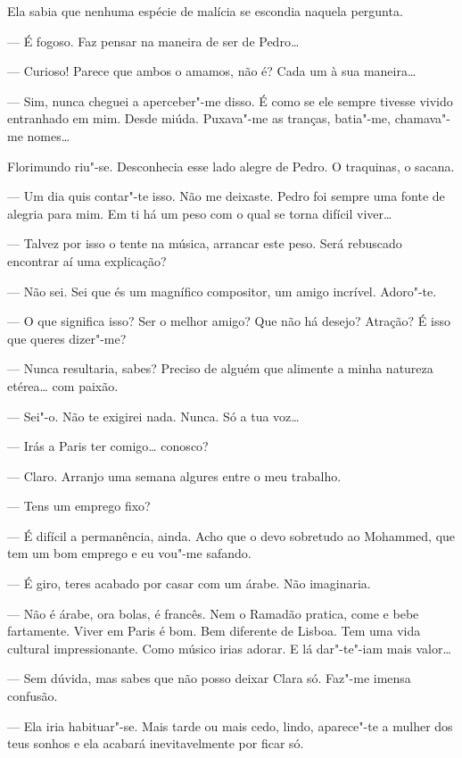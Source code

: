 Ela sabia que nenhuma espécie de malícia se escondia naquela pergunta.

--- É fogoso. Faz pensar na maneira de ser de Pedro\ldots{}

--- Curioso! Parece que ambos o amamos, não é? Cada um à sua maneira\ldots{}

--- Sim, nunca cheguei a aperceber"-me disso. É como se ele sempre tivesse
vivido entranhado em mim. Desde miúda. Puxava"-me as tranças, batia"-me,
chamava"-me nomes\ldots{}

Florimundo riu"-se. Desconhecia esse lado alegre de Pedro. O traquinas, o
sacana.

--- Um dia quis contar"-te isso. Não me deixaste. Pedro foi sempre uma
fonte de alegria para mim. Em ti há um peso com o qual se torna difícil
viver\ldots{}

--- Talvez por isso o tente na música, arrancar este peso. Será rebuscado
encontrar aí uma explicação?

--- Não sei. Sei que és um magnífico compositor, um amigo incrível.
Adoro"-te.

--- O que significa isso? Ser o melhor amigo? Que não há desejo? Atração?
É isso que queres dizer"-me?

--- Nunca resultaria, sabes? Preciso de alguém que alimente a minha
natureza etérea\ldots{} com paixão.

--- Sei"-o. Não te exigirei nada. Nunca. Só a tua voz\ldots{}

--- Irás a Paris ter comigo\ldots{} conosco?

--- Claro. Arranjo uma semana algures entre o meu trabalho.

--- Tens um emprego fixo?

--- É difícil a permanência, ainda. Acho que o devo sobretudo ao Mohammed,
que tem um bom emprego e eu vou"-me safando.

--- É giro, teres acabado por casar com um árabe. Não imaginaria.

--- Não é árabe, ora bolas, é francês. Nem o Ramadão pratica, come e bebe
fartamente. Viver em Paris é bom. Bem diferente de Lisboa. Tem uma vida
cultural impressionante. Como músico irias adorar. E lá dar"-te"-iam mais
valor\ldots{}

--- Sem dúvida, mas sabes que não posso deixar Clara só. Faz"-me imensa
confusão.

--- Ela iria habituar"-se. Mais tarde ou mais cedo, lindo, aparece"-te a
mulher dos teus sonhos e ela acabará inevitavelmente por ficar só.

